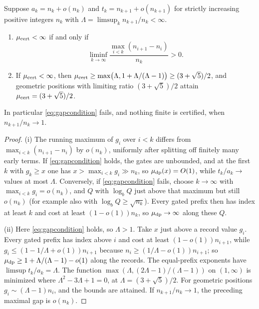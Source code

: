 \documentclass[11pt]{article}
\begin{document}
\begin{proposition}\label{prop:certificate}
Suppose $a_k=n_k+o(n_k)$ and $t_k=n_{k+1}+o(n_{k+1})$ for strictly increasing positive integers $n_k$ with
$\Lambda=\limsup_kn_{k+1}/n_k<\infty$.
\begin{enumerate}[label=\textup{(\roman*)},nosep]
\item $\mu_{\rm cert}<\infty$ if and only if
\begin{equation}\label{eq:gapcondition}
\liminf_{k\to\infty}\frac{\max_{i<k}(n_{i+1}-n_i)}{n_k}>0 .
\end{equation}
\item If $\mu_{\rm cert}<\infty$, then $\mu_{\rm cert}\ge\max\bigl(\Lambda,1+\Lambda/(\Lambda-1)\bigr)\ge(3+\sqrt5)/2$, and geometric positions with
limiting ratio $(3+\sqrt5)/2$ attain $\mu_{\rm cert}=(3+\sqrt5)/2$.
\end{enumerate}
In particular \eqref{eq:gapcondition} fails, and nothing finite is certified, when $n_{k+1}/n_k\to1$.
\end{proposition}

\begin{proof}
(i) The running maximum of $g_i$ over $i<k$ differs from $\max_{i<k}(n_{i+1}-n_i)$ by $o(n_k)$, uniformly after splitting off
finitely many early terms. If \eqref{eq:gapcondition} holds, the gates are unbounded, and at the first $k$ with $g_k\ge x$ one
has $x>\max_{i<k}g_i\gg n_k$, so $\mu_{\rm dp}(x)=O(1)$, while $t_k/a_k\to$ values at most $\Lambda$. Conversely, if
\eqref{eq:gapcondition} fails, choose $k\to\infty$ with $\max_{i<k}g_i=o(n_k)$, and $Q$ with $\log_bQ$ just above that maximum but
still $o(n_k)$ (for example also with $\log_bQ\ge\sqrt{n_k}$). Every gated prefix then has index at least $k$ and cost at least
$(1-o(1))n_k$, so $\mu_{\rm dp}\to\infty$ along these $Q$.

(ii) Here \eqref{eq:gapcondition} holds, so $\Lambda>1$. Take $x$ just above a record value $g_i$. Every gated prefix has index
above $i$ and cost at least $(1-o(1))n_{i+1}$, while $g_i\le(1-1/\Lambda+o(1))n_{i+1}$ because $n_i\ge(1/\Lambda-o(1))n_{i+1}$; so
$\mu_{\rm dp}\ge1+\Lambda/(\Lambda-1)-o(1)$ along the records. The equal-prefix exponents have $\limsup t_k/a_k=\Lambda$. The function
$\max(\Lambda,(2\Lambda-1)/(\Lambda-1))$ on $(1,\infty)$ is minimized where $\Lambda^2-3\Lambda+1=0$, at $\Lambda=(3+\sqrt5)/2$. For geometric
positions $g_i\sim(\Lambda-1)n_i$, and the bounds are attained. If $n_{k+1}/n_k\to1$, the preceding maximal gap is $o(n_k)$.
\end{proof}
\end{document}
